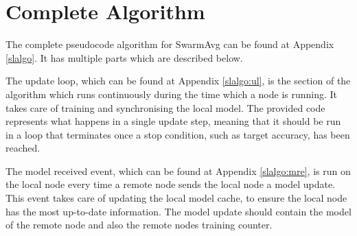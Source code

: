 \section{Complete Algorithm}
The complete pseudocode algorithm for SwarmAvg can be found at Appendix \ref{slalgo}. It has multiple parts which are described below.

The update loop, which can be found at Appendix \ref{slalgo:ul}, is the section of the algorithm which runs continuously during the time which a node is running. It takes care of training and synchronising the local model. The provided code represents what happens in a single update step, meaning that it should be run in a loop that terminates once a stop condition, such as target accuracy, has been reached.

The model received event, which can be found at Appendix \ref{slalgo:mre}, is run on the local node every time a remote node sends the local node a model update. This event takes care of updating the local model cache, to ensure the local node has the most up-to-date information. The model update should contain the model of the remote node and also the remote nodes training counter.
